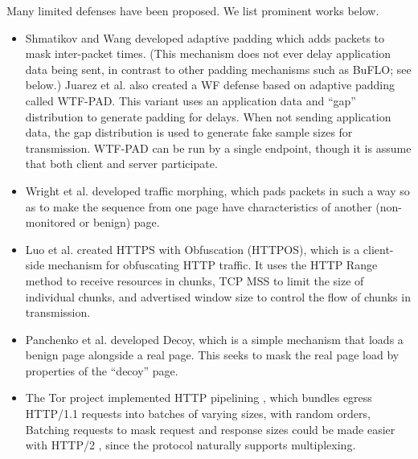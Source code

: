 \documentclass[runningheads]{llncs}
\begin{document}
Many limited defenses have been proposed. We list prominent works below.
\begin{itemize}
\item Shmatikov and Wang \cite{shmatikov2006timing} developed adaptive padding which adds packets to mask 
inter-packet times. (This mechanism does not ever delay application data being sent, in contrast to other
padding mechanisms such as BuFLO; see below.) 
Juarez et al. \cite{juarez2016toward} also created a WF defense based on adaptive padding called WTF-PAD. 
This variant uses an application data and ``gap'' distribution to generate padding for delays. When
not sending application data, the gap distribution is used to generate fake sample sizes for transmission.
WTF-PAD can be run by a single endpoint, though it is assume that both client and server participate.
\item Wright et al. \cite{wright2009traffic} developed traffic morphing, which pads packets in such a way
so as to make the sequence from one page have characteristics of another (non-monitored or benign) page.
\item Luo et al. \cite{luo2011httpos} created HTTPS with Obfuscation (HTTPOS), which is a client-side
mechanism for obfuscating HTTP traffic. It uses the HTTP Range method to receive resources in chunks, TCP 
MSS to limit the size of individual chunks, and advertised window size to control the flow of chunks
in transmission.
\item Panchenko et al. \cite{panchenko2011website} developed Decoy, which is a simple mechanism that loads
a benign page alongside a real page. This seeks to mask the real page load by properties of the ``decoy'' page.
\item The Tor project implemented HTTP pipelining \cite{perry2011experimental}, which bundles egress HTTP/1.1
requests into batches of varying sizes, with random orders, Batching requests to mask request and response sizes
could be made easier with HTTP/2 \cite{rfc7540}, since the protocol naturally supports multiplexing. 
\end{itemize}
\end{document}
